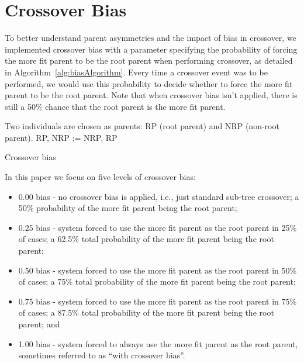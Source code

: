 \documentclass{sig-alternate}
\begin{document}
\section{Crossover Bias} \label{sec:XObias}

To better understand parent asymmetries and the impact of bias in crossover, 
we implemented crossover bias with a parameter specifying the probability of forcing the more fit parent
to be the root parent when performing crossover, as detailed in Algorithm~\ref{alg:biasAlgorithm}. Every time a
crossover event was to be performed, we would use this probability to decide whether to force the more fit parent to be
the root parent. 
Note that when crossover bias isn't applied, there is still a 50\% chance that the root parent is the more fit
parent.

\begin{algorithm}[tb]
\begin{algorithmic}
\Require Two individuals are chosen as parents: RP (root parent) and NRP (non-root parent).
 
        \State RP, NRP := NRP, RP  
    \EndIf
\EndIf
\end{algorithmic}
\caption{Crossover bias}
\label{alg:biasAlgorithm}
\end{algorithm}

In this paper we focus on five levels of crossover bias:
\begin{itemize}
\item 0.00 bias - no crossover bias is applied, i.e., just standard sub-tree crossover; 
	a 50\% probability of the more fit parent being the root parent;
\item 0.25 bias - system forced to use the more fit parent as the root parent in 25\% of cases; 
	a 62.5\% total probability of the more fit parent being the root parent;
\item 0.50 bias - system forced to use the more fit parent as the root parent in 50\% of cases; 
	a 75\% total probability of the more fit parent being the root parent;
\item 0.75 bias - system forced to use the more fit parent as the root parent in 75\% of cases; 
	a 87.5\% total probability of the more fit parent being the root parent; and
\item 1.00 bias - system forced to always use the more fit parent as the root parent, sometimes 
	referred to as ``with crossover bias''.
\end{itemize}
\end{document}
